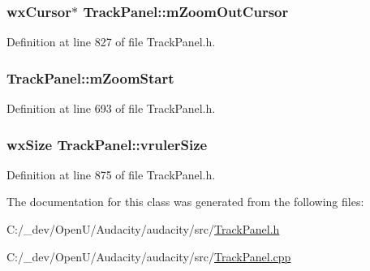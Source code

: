 \subsubsection[{\texorpdfstring{m\+Zoom\+Out\+Cursor}{mZoomOutCursor}}]{\setlength{\rightskip}{0pt plus 5cm}wx\+Cursor$\ast$ Track\+Panel\+::m\+Zoom\+Out\+Cursor\hspace{0.3cm}{\ttfamily [protected]}}\hypertarget{class_track_panel_a2e34ef324bc6b3ccb8229f644750aac8}{}\label{class_track_panel_a2e34ef324bc6b3ccb8229f644750aac8}


Definition at line 827 of file Track\+Panel.\+h.

\subsubsection[{\texorpdfstring{m\+Zoom\+Start}{mZoomStart}}]{ Track\+Panel\+::m\+Zoom\+Start\hspace{0.3cm}{\ttfamily [protected]}}\hypertarget{class_track_panel_ad4dd4fe2eed8b7d44af502c2d3c75b57}{}\label{class_track_panel_ad4dd4fe2eed8b7d44af502c2d3c75b57}


Definition at line 693 of file Track\+Panel.\+h.

\subsubsection[{\texorpdfstring{vruler\+Size}{vrulerSize}}]{\setlength{\rightskip}{0pt plus 5cm}wx\+Size Track\+Panel\+::vruler\+Size}\hypertarget{class_track_panel_a6db02b5d0562bf11311bc2df73a0864a}{}\label{class_track_panel_a6db02b5d0562bf11311bc2df73a0864a}


Definition at line 875 of file Track\+Panel.\+h.



The documentation for this class was generated from the following files\+:\begin{DoxyCompactItemize}
\item 
C\+:/\+\_\+dev/\+Open\+U/\+Audacity/audacity/src/\hyperlink{_track_panel_8h}{Track\+Panel.\+h}\item 
C\+:/\+\_\+dev/\+Open\+U/\+Audacity/audacity/src/\hyperlink{_track_panel_8cpp}{Track\+Panel.\+cpp}\end{DoxyCompactItemize}
